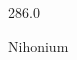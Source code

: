 \documentclass[12pt]{article}
\begin{document}
\hfill{}
\vfill
\begin{center}
  {\fontsize{50}{60}
  }

  286.0

Nihonium
\end{center}
\vfill
\end{document}
